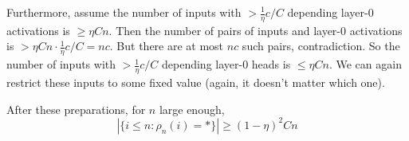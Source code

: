 \documentclass[11pt,a4paper]{article}
\begin{document}
Furthermore, assume the number of inputs with $> \frac{1}{\eta} c/C$ depending layer-0 activations is $\geq \eta Cn$.
Then the number of pairs of inputs and layer-0 activations is $>\eta Cn \cdot \frac{1}{\eta} c/C = nc$.
But there are at most $nc$ such pairs, contradiction.
So the number of inputs with $> \frac{1}{\eta} c/C$ depending layer-0 heads is $\leq \eta Cn$.
We can again restrict these inputs to some fixed value (again, it doesn't matter which one).

After these preparations, for $n$ large enough,
\begin{equation}
|\{i \leq n: \rho_n(i) = *\}| \geq (1-\eta)^2 C n
\end{equation}





\end{document}

